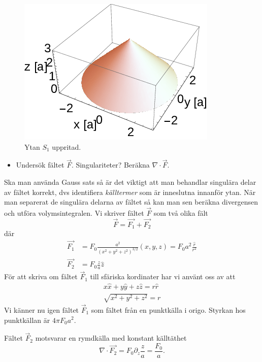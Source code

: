 \documentclass[%
oneside,                 %
final,                   %
10pt]{article}
\newenvironment{doconceexercise}{}{}
\begin{document}
\begin{doconceexercise}
\begin{figure}[!ht]  %
  \centerline{\includegraphics[width=0.8\linewidth]{cone.png}}
  \caption{
  Ytan $S_1$ uppritad. \label{fig:cone}
  }
\end{figure}


\begin{itemize}
\item Undersök fältet $\vec{F}$. Singulariteter? Beräkna $\nabla \cdot \vec{F}$.
\end{itemize}

\noindent
Ska man använda Gauss sats så är det viktigt att man behandlar singulära delar av fältet korrekt, dvs identifiera \emph{källtermer} som är inneslutna innanför ytan. När man separerat de singulära delarna av fältet så kan man sen beräkna divergensen och utföra volymsintegralen. Vi skriver fältet $\vec{F}$ som två olika fält 
\begin{equation}
\vec{F}=\vec{F_1}+\vec{F_2}
\end{equation}
där 
\begin{align}
\vec{F_1}&= F_0 \frac{a^2}{(x^2+y^2+z^2)^{3/2}} \left( x,y,z \right ) = F_0 a^2 \frac{\hat{r}}{r^2}\\
\vec{F_2}&= F_0 \frac{z}{a}\hat{z}
\end{align}
För att skriva om fältet $\vec{F}_1$ till sfäriska kordinater har vi använt oss av att
\begin{align}
x\hat{x}+y\hat{y}+z\hat{z} = r\hat{r}\\
\sqrt{x^2+y^2+z^2}=r
\end{align}
Vi känner nu igen fältet $\vec{F}_1$ som fältet från en punktkälla i origo. Styrkan hos punktkällan är $4\pi F_0 a^2$. 

Fältet $\vec{F}_2$ motsvarar en rymdkälla med konstant källtäthet
\begin{equation}
\nabla \cdot \vec{F_2} = F_0 \partial_z \frac{z}{a} = \frac{F_0}{a}.
\end{equation}


\end{doconceexercise}
\end{document}
